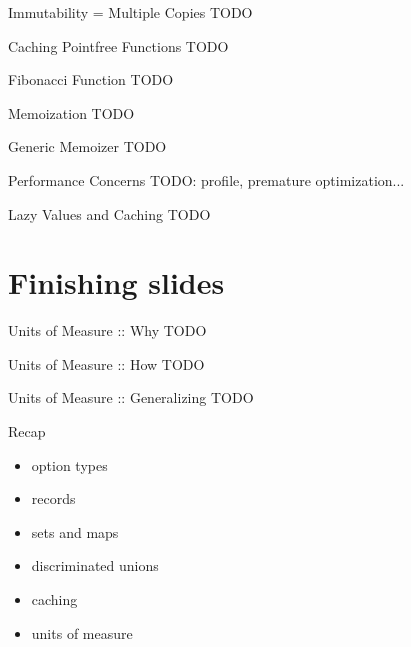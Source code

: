 \documentclass{beamer}
\begin{document}
\begin{frame}{Immutability = Multiple Copies}
  TODO
\end{frame}

\begin{frame}{Caching Pointfree Functions}
  TODO
\end{frame}

\begin{frame}{Fibonacci Function}
  TODO
\end{frame}

\begin{frame}{Memoization}
  TODO
\end{frame}

\begin{frame}{Generic Memoizer}
  TODO
\end{frame}

\begin{frame}{Performance Concerns}
  TODO: profile, premature optimization...
\end{frame}

\begin{frame}{Lazy Values and Caching}
  TODO
\end{frame}

\section{Finishing slides}
\frame{\tableofcontents[currentsection]}

\begin{frame}{Units of Measure :: Why}
  TODO
\end{frame}

\begin{frame}{Units of Measure :: How}
  TODO
\end{frame}

\begin{frame}{Units of Measure :: Generalizing}
  TODO
\end{frame}

\begin{frame}{Recap}
  \begin{itemize}[<+->]
    \item option types
    \item records
    \item sets and maps
    \item discriminated unions
    \item caching
    \item units of measure
  \end{itemize}
\end{frame}
\end{document}
